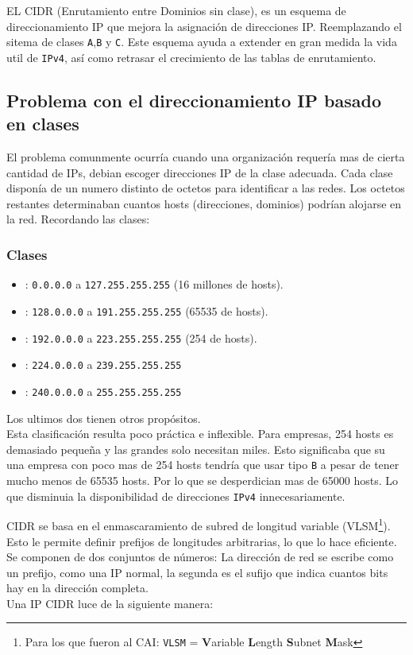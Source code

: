 EL CIDR (Enrutamiento entre Dominios sin clase), es un esquema de direccionamiento IP que mejora la asignación de direcciones IP. Reemplazando el sitema de clases \texttt{A},\texttt{B} y \texttt{C}. Este esquema ayuda a extender en gran medida la vida util de \texttt{IPv4}, así como retrasar el crecimiento de las tablas de enrutamiento.

\subsection*{Problema con el direccionamiento IP basado en clases}
El problema comunmente ocurría cuando una organización requería mas de cierta cantidad de IPs, debian escoger direcciones IP de la clase adecuada. Cada clase disponía de un numero distinto de octetos para identificar a las redes. Los octetos restantes determinaban cuantos hosts (direcciones, dominios) podrían alojarse en la red. Recordando las clases:
\subsubsection*{Clases}
\begin{itemize}
\item {} : \texttt{0.0.0.0} a \texttt{127.255.255.255}  (16 millones de hosts).
\item {} : \texttt{128.0.0.0} a \texttt{191.255.255.255}  (65535 de hosts). 
\item {} : \texttt{192.0.0.0} a \texttt{223.255.255.255}  (254 de hosts).
\item {} : \texttt{224.0.0.0} a \texttt{239.255.255.255}
\item {} : \texttt{240.0.0.0} a \texttt{255.255.255.255}
\end{itemize}
Los ultimos dos tienen otros propósitos. \\${ }$\\
Esta clasificación resulta poco práctica e inflexible. Para empresas, 254 hosts es demasiado pequeña y las grandes solo necesitan miles. Esto significaba que su una empresa con poco mas de 254 hosts tendría que usar tipo \texttt{B} a pesar de tener mucho menos de 65535 hosts. Por lo que se desperdician mas de 65000 hosts. Lo que disminuia la disponibilidad de direcciones \texttt{IPv4} innecesariamente.

CIDR se basa en el enmascaramiento de subred de longitud variable (VLSM\footnote{Para los que fueron al CAI: \texttt{VLSM} = \textbf{V}ariable \textbf{L}ength \textbf{S}ubnet \textbf{M}ask}). Esto le permite definir prefijos de longitudes arbitrarias, lo que lo hace eficiente. Se componen de dos conjuntos de números: La dirección de red se escribe como un prefijo, como una IP normal, la segunda es el sufijo que indica cuantos bits hay en la dirección completa.
\\ ${ }$ \\
Una IP CIDR luce de la siguiente manera:

